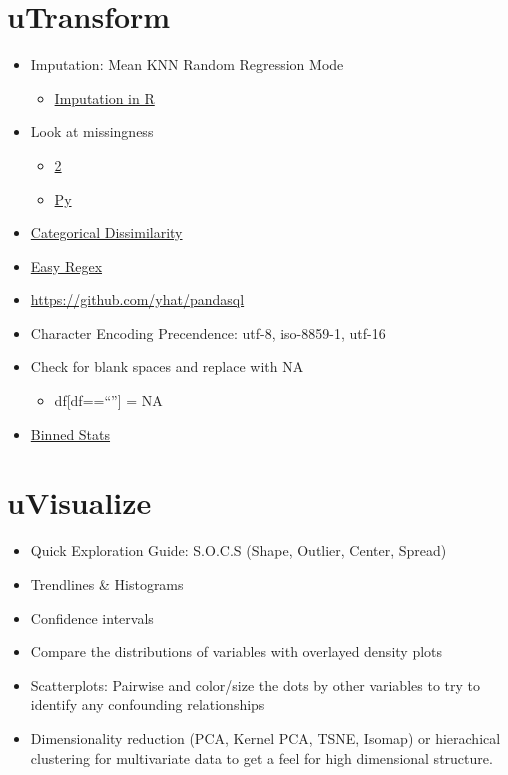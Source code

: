 \documentclass[]{book}
\providecommand{\tightlist}{%
  \setlength{\itemsep}{0pt}\setlength{\parskip}{0pt}}
\theoremstyle{definition}
\theoremstyle{definition}
\theoremstyle{definition}
\theoremstyle{remark}
\begin{document}
\section{uTransform}\label{utransform}

\begin{itemize}
\item
  Imputation: Mean \textbar{} KNN \textbar{} Random \textbar{}
  Regression \textbar{} Mode

  \begin{itemize}
  \tightlist
  \item
    \href{https://cran.r-project.org/web/packages/simputation/index.html}{Imputation
    in R}
  \end{itemize}
\item
  Look at missingness

  \begin{itemize}
  \tightlist
  \item
    \href{https://github.com/njtierney/naniar}{2}
  \item
    \href{https://github.com/ResidentMario/missingno}{Py}
  \end{itemize}
\item
  \href{https://www.rdocumentation.org/packages/StatMatch/versions/1.2.5/topics/gower.dist}{Categorical
  Dissimilarity}
\item
  \href{https://github.com/VerbalExpressions/PythonVerbalExpressions}{Easy
  Regex}
\item
  \url{https://github.com/yhat/pandasql}
\item
  Character Encoding Precendence: utf-8, iso-8859-1, utf-16
\item
  Check for blank spaces and replace with NA

  \begin{itemize}
  \tightlist
  \item
    df{[}df==``''{]} = NA
  \end{itemize}
\item
  \href{https://docs.scipy.org/doc/scipy-0.16.0/reference/generated/scipy.stats.binned_statistic.html}{Binned
  Stats}
\end{itemize}

\section{uVisualize}\label{uvisualize}

\begin{itemize}
\item
  Quick Exploration Guide: S.O.C.S (Shape, Outlier, Center, Spread)
\item
  Trendlines \& Histograms
\item
  Confidence intervals
\item
  Compare the distributions of variables with overlayed density plots
\item
  Scatterplots: Pairwise and color/size the dots by other variables to
  try to identify any confounding relationships
\item
  Dimensionality reduction (PCA, Kernel PCA, TSNE, Isomap) or
  hierachical clustering for multivariate data to get a feel for high
  dimensional structure.
\end{itemize}
\end{document}
